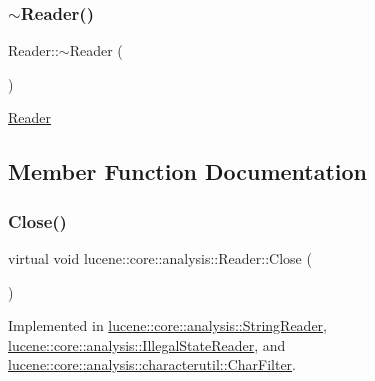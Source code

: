 \subsubsection{\texorpdfstring{$\sim$\+Reader()}{~Reader()}}
{\footnotesize\ttfamily Reader\+::$\sim$\+Reader (\begin{DoxyParamCaption}{ }\end{DoxyParamCaption})\hspace{0.3cm}{\ttfamily [virtual]}}

\mbox{\hyperlink{classlucene_1_1core_1_1analysis_1_1Reader}{Reader}} 

\subsection{Member Function Documentation}
\mbox{\label{classlucene_1_1core_1_1analysis_1_1Reader_a4be7e96dccdd3e276e3450e3ad7a70f4}} 
\subsubsection{\texorpdfstring{Close()}{Close()}}
{\footnotesize\ttfamily virtual void lucene\+::core\+::analysis\+::\+Reader\+::\+Close (\begin{DoxyParamCaption}{ }\end{DoxyParamCaption})\hspace{0.3cm}{\ttfamily [pure virtual]}}



Implemented in \mbox{\hyperlink{classlucene_1_1core_1_1analysis_1_1StringReader_ac2938d531e7842abb8423149982328e3}{lucene\+::core\+::analysis\+::\+String\+Reader}}, \mbox{\hyperlink{classlucene_1_1core_1_1analysis_1_1IllegalStateReader_aa92b3c9c3da611e2e44c3edf4078dbe6}{lucene\+::core\+::analysis\+::\+Illegal\+State\+Reader}}, and \mbox{\hyperlink{classlucene_1_1core_1_1analysis_1_1characterutil_1_1CharFilter_a47ff3dc61979b80927ed5779cb55bd09}{lucene\+::core\+::analysis\+::characterutil\+::\+Char\+Filter}}.

\mbox{\label{classlucene_1_1core_1_1analysis_1_1Reader_af7a24f3904f9c40e9c5c204b3434f1f7}} 
